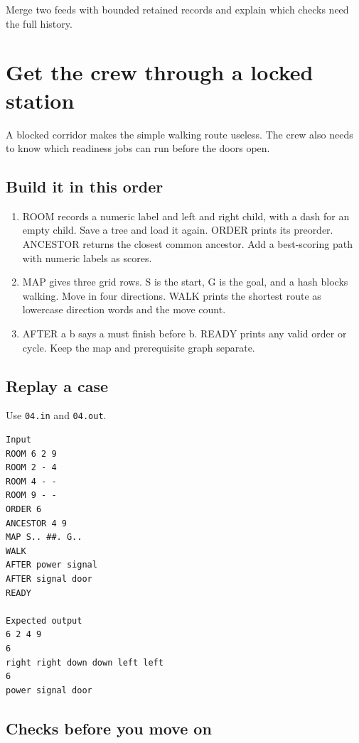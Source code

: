 \documentclass[11pt,letterpaper]{article}
\begin{document}
Merge two feeds with bounded retained records and explain which checks need the full history.

\clearpage

\section{Get the crew through a locked station}\label{trains:04}

A blocked corridor makes the simple walking route useless. The crew also needs to know which readiness jobs can run before the doors open.

\subsection*{Build it in this order}

\begin{enumerate}
\item ROOM records a numeric label and left and right child, with a dash for an empty child. Save a tree and load it again. ORDER prints its preorder. ANCESTOR returns the closest common ancestor. Add a best-scoring path with numeric labels as scores.
\item MAP gives three grid rows. S is the start, G is the goal, and a hash blocks walking. Move in four directions. WALK prints the shortest route as lowercase direction words and the move count.
\item AFTER a b says a must finish before b. READY prints any valid order or cycle. Keep the map and prerequisite graph separate.
\end{enumerate}

\subsection*{Replay a case}

Use \texttt{04.in} and \texttt{04.out}.

\begin{samepage}
\small
\begin{verbatim}
Input
ROOM 6 2 9
ROOM 2 - 4
ROOM 4 - -
ROOM 9 - -
ORDER 6
ANCESTOR 4 9
MAP S.. ##. G..
WALK
AFTER power signal
AFTER signal door
READY

Expected output
6 2 4 9
6
right right down down left left
6
power signal door
\end{verbatim}
\end{samepage}

\subsection*{Checks before you move on}
\end{document}
